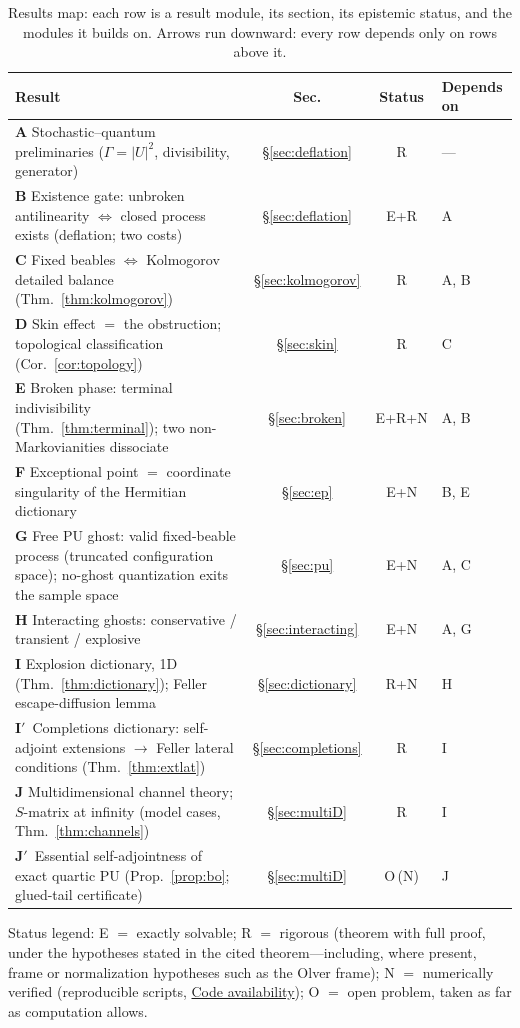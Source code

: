 \documentclass[11pt]{article}
\theoremstyle{definition}
\theoremstyle{remark}
\newcommand{\Gam}{\Gamma}
\begin{document}
\begin{table}[ht]
\centering
\small
\begin{tabular}{@{}p{7.4cm} c c l@{}}
\toprule
Result & Sec. & Status & Depends on\\
\midrule
\textbf{A}\; Stochastic--quantum preliminaries ($\Gam=|U|^{2}$,
  divisibility, generator) & \S\ref{sec:deflation} & R & ---\\
\textbf{B}\; Existence gate: unbroken antilinearity
  $\Leftrightarrow$ closed process exists (deflation; two costs)
  & \S\ref{sec:deflation} & E{+}R & A\\
\textbf{C}\; Fixed beables $\Leftrightarrow$ Kolmogorov detailed
  balance (Thm.~\ref{thm:kolmogorov}) & \S\ref{sec:kolmogorov} & R & A, B\\
\textbf{D}\; Skin effect $=$ the obstruction; topological
  classification (Cor.~\ref{cor:topology}) & \S\ref{sec:skin} & R & C\\
\textbf{E}\; Broken phase: terminal indivisibility
  (Thm.~\ref{thm:terminal}); two non-Markovianities dissociate
  & \S\ref{sec:broken} & E{+}R{+}N & A, B\\
\textbf{F}\; Exceptional point $=$ coordinate singularity of the
  Hermitian dictionary & \S\ref{sec:ep} & E{+}N & B, E\\
\textbf{G}\; Free PU ghost: valid fixed-beable process (truncated
  configuration space); no-ghost
  quantization exits the sample space & \S\ref{sec:pu} & E{+}N & A, C\\
\textbf{H}\; Interacting ghosts: conservative / transient /
  explosive & \S\ref{sec:interacting} & E{+}N & A, G\\
\textbf{I}\; Explosion dictionary, 1D (Thm.~\ref{thm:dictionary});
  Feller escape-diffusion lemma & \S\ref{sec:dictionary} & R{+}N & H\\
\textbf{I$'$}\, Completions dictionary: self-adjoint extensions
  $\to$ Feller lateral conditions (Thm.~\ref{thm:extlat})
  & \S\ref{sec:completions} & R & I\\
\textbf{J}\; Multidimensional channel theory; $S$-matrix at
  infinity (model cases, Thm.~\ref{thm:channels}) & \S\ref{sec:multiD} & R & I\\
\textbf{J$'$}\, Essential self-adjointness of exact quartic PU
  (Prop.~\ref{prop:bo}; glued-tail certificate) & \S\ref{sec:multiD}
  & O\,(N) & J\\
\bottomrule
\end{tabular}

\smallskip
{\footnotesize Status legend: E $=$ exactly solvable;
R $=$ rigorous (theorem with full proof, under the hypotheses stated in
the cited theorem---including, where present, frame or normalization
hypotheses such as the Olver frame); N $=$ numerically
verified (reproducible scripts, \hyperref[sec:code]{Code availability});
O $=$ open problem, taken as far as computation allows.}
\caption{Results map: each row is a result module, its section, its
epistemic status, and the modules it builds on. Arrows run downward:
every row depends only on rows above it.}
\label{tab:resultsmap}
\end{table}
\end{document}
